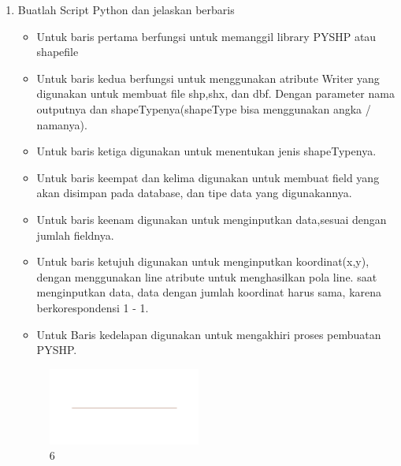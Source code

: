 \begin{enumerate}
	\item Buatlah Script Python dan jelaskan berbaris
	
	\begin{itemize}
		\item Untuk baris pertama berfungsi untuk memanggil library PYSHP atau shapefile
		\item Untuk baris kedua berfungsi untuk menggunakan atribute Writer yang digunakan untuk membuat file shp,shx, dan dbf. \hfill\break Dengan parameter nama outputnya dan shapeTypenya(shapeType bisa menggunakan angka / namanya).
		\item Untuk baris ketiga digunakan untuk menentukan jenis shapeTypenya.
		\item Untuk baris keempat dan kelima digunakan untuk membuat field yang akan disimpan pada database, dan tipe data yang digunakannya.
		\item Untuk baris keenam digunakan untuk menginputkan data,sesuai dengan jumlah fieldnya.
		\item Untuk baris ketujuh digunakan untuk menginputkan koordinat(x,y), dengan menggunakan line atribute untuk menghasilkan pola line. \hfill\break
		saat menginputkan data, data dengan jumlah koordinat harus sama, karena berkorespondensi 1 - 1.
		\item Untuk Baris kedelapan digunakan untuk mengakhiri proses pembuatan PYSHP.
	\end{itemize}
	\hfill\break
	\begin{figure}[H]
		\includegraphics[width=5cm]{figures/1174009/2/6.png}
		\centering
		\caption{6}
	\end{figure}


\end{enumerate}
